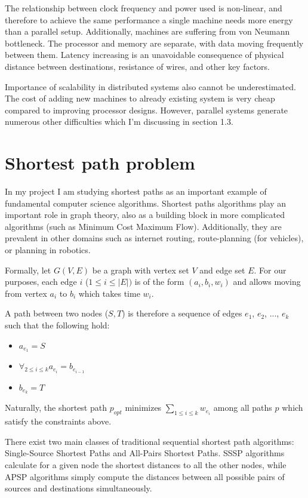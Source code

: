 \documentclass[12pt,a4paper,twoside,openright]{report}
\begin{document}
The relationship between clock frequency and power used is non-linear, and therefore to achieve the same performance a single machine needs more energy than a parallel setup. Additionally, machines are suffering from von Neumann bottleneck. The processor and memory are separate, with data moving frequently between them. Latency increasing is an unavoidable consequence of physical distance between destinations, resistance of wires, and other key factors. 

Importance of scalability in distributed systems also cannot be underestimated. The cost of adding new machines to already existing system is very cheap compared to improving processor designs. 
However, parallel systems generate numerous other difficulties which I'm discussing in section 1.3.

\section{Shortest path problem}
In my project I am studying shortest paths as an important example of fundamental computer science algorithms. Shortest paths algorithms play an important role in graph theory, also as a building block in more complicated algorithms (such as Minimum Cost Maximum Flow). Additionally, they are prevalent in other domains such as internet routing, route-planning (for vehicles), or planning in robotics. 

Formally, let $G(V,E)$ be a graph with vertex set $V$ and edge set $E$. For our purposes, each edge $i$ ($1\leq i\leq |E|)$ is of the form $(a_i, b_i, w_i)$ and allows moving from vertex $a_i$ to $b_i$ which takes time $w_i$. 

A path between two nodes ($S, T$) is therefore a sequence of edges $e_1$, $e_2$, ..., $e_k$ such that the following hold:
\begin{itemize}
    \item $a_{e_1} = S$
    \item $\displaystyle\mathop{\forall}_{2\leq i \leq k} a_{e_{i}} = b_{e_{i-1}}$
    \item $b_{e_k} = T$
\end{itemize}

Naturally, the shortest path $p_{opt}$ minimizes $\displaystyle\mathop{\sum}_{1\leq i \leq k} w_{e_i}$ among all paths $p$ which satisfy the constraints above.

There exist two main classes of traditional sequential shortest path algorithms: Single-Source Shortest Paths and All-Pairs Shortest Paths. SSSP algorithms calculate for a given node the shortest distances to all the other nodes, while APSP algorithms simply compute the distances between all possible pairs of sources and destinations simultaneously.
\end{document}
